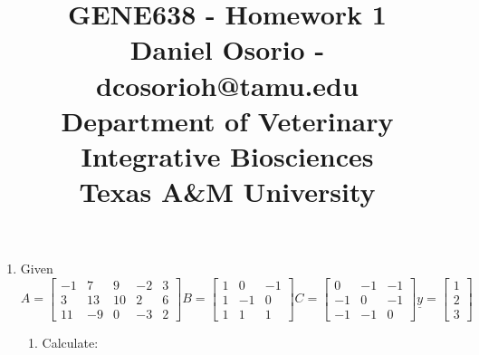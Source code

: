 \documentclass[12pt,a4paper]{paper}
\begin{document}
\title{GENE638 - Homework 1\\\small{Daniel Osorio - dcosorioh@tamu.edu\\Department of Veterinary Integrative Biosciences\\Texas A\&M University}}
\maketitle

\begin{enumerate}
\item Given \[A = \left[\begin{array}{ccccc}-1 & 7 & 9 & -2 & 3\\ 3 & 13 & 10 & 2 & 6 \\ 11 & -9 & 0 & -3 & 2 \end{array}\right]B = \left[\begin{array}{ccc}1 & 0 & -1 \\ 1 & -1 & 0 \\ 1 & 1 & 1\end{array}\right]C = \left[\begin{array}{ccc}0 & -1 & -1 \\ -1 & 0 & -1 \\ -1 & -1 & 0\end{array}\right] \underline{y} = \left[\begin{array}{c}1\\2\\3\end{array}\right]\]
\begin{enumerate}
\item Calculate:
\begin{enumerate}
\end{enumerate}
\end{enumerate}
\end{enumerate}
\end{document}
